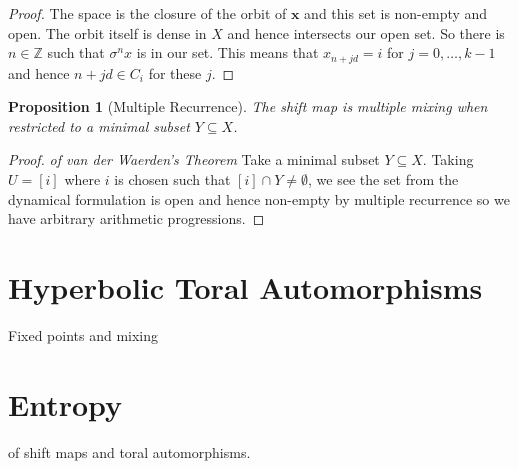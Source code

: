 \documentclass[11pt]{article}
\newcommand{\Z}{\mathbb{Z}}
\newcommand{\mv}[1]{\textbf{#1}}
\newtheorem{prop}[theorem]{Proposition}
\begin{document}
\begin{proof}
The space is the closure of the orbit of $\mv{x}$ and this set is non-empty and open.
The orbit itself is dense in $X$ and hence intersects our open set.
So there is $n\in\Z$ such that $\sigma^n x$ is in our set.
This means that $x_{n+jd}=i$ for $j=0, \dots, k-1$ and hence $n+jd\in C_i$ for these $j$.
\end{proof}

\begin{prop}[Multiple Recurrence]
The shift map is multiple mixing when restricted to a minimal subset $Y\subseteq X$.
\end{prop}

\begin{proof}
\textit{of van der Waerden's Theorem}
Take a minimal subset $Y\subseteq X$.
Taking $U=[i]$ where $i$ is chosen such that $[i]\cap Y \neq \emptyset$, we see the set from the dynamical formulation is open and hence non-empty by multiple recurrence so we have arbitrary arithmetic progressions.
\end{proof}

\section{Hyperbolic Toral Automorphisms}
Fixed points and mixing

\section{Entropy}
of shift maps and toral automorphisms.
\end{document}

